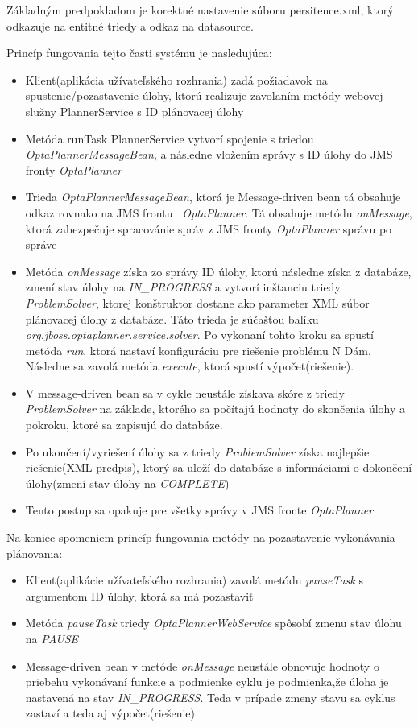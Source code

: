 Základným predpokladom je korektné nastavenie súboru persitence.xml, ktorý odkazuje na entitné triedy a odkaz na datasource.

Princíp fungovania tejto časti systému je nasledujúca:
\begin{itemize}
\item Klient(aplikácia užívateľského rozhrania) zadá požiadavok na spustenie/pozastavenie úlohy, ktorú realizuje zavolaním metódy webovej služny PlannerService s ID plánovacej úlohy
\item Metóda runTask PlannerService vytvorí spojenie s triedou \emph{OptaPlannerMessageBean}, a následne vložením správy s ID úlohy do JMS fronty \emph{OptaPlanner}
\item Trieda \emph{OptaPlannerMessageBean}, ktorá je Message-driven bean tá obsahuje odkaz rovnako na JMS frontu  \emph{OptaPlanner}. Tá obsahuje metódu \emph{onMessage}, ktorá zabezpečuje spracovánie správ z JMS fronty \emph{OptaPlanner} správu po správe
\item Metóda \emph{onMessage} získa zo správy ID úlohy, ktorú následne získa z databáze, zmení stav úlohy na \emph{IN_PROGRESS} a vytvorí inštanciu triedy \emph{ProblemSolver}, ktorej konštruktor dostane ako parameter XML súbor plánovacej úlohy z databáze. Táto trieda je súčaštou balíku \emph{org.jboss.optaplanner.service.solver}. Po vykonaní tohto kroku sa spustí metóda \emph{run}, ktorá nastaví konfiguráciu pre riešenie problému N Dám. Následne sa zavolá metóda \emph{execute}, ktorá spustí výpočet(riešenie).
\item V message-driven bean sa v cykle neustále získava skóre z triedy \emph{ProblemSolver} na základe, ktorého sa počítajú hodnoty do skončenia úlohy a pokroku, ktoré sa zapisujú do databáze.
\item Po ukončení/vyriešení úlohy sa z triedy \emph{ProblemSolver} získa najlepšie riešenie(XML predpis), ktorý sa uloží do databáze s informáciami o dokončení úlohy(zmení stav úlohy na \emph{COMPLETE})
\item Tento postup sa opakuje pre všetky správy v JMS fronte \emph{OptaPlanner}
\end{itemize}

Na koniec spomeniem princíp fungovania metódy na pozastavenie vykonávania plánovania:
\begin{itemize}
\item Klient(aplikácie užívateľského rozhrania) zavolá metódu \emph{pauseTask} s argumentom ID úlohy, ktorá sa má pozastaviť
\item Metóda \emph{pauseTask} triedy \emph{OptaPlannerWebService} spôsobí zmenu stav úlohu na \emph{PAUSE}
\item Message-driven bean v metóde \emph{onMessage} neustále obnovuje hodnoty o priebehu vykonávaní funkcie a podmienke cyklu je podmienka,že úloha je nastavená na stav \emph{IN_PROGRESS}. Teda v prípade zmeny stavu sa cyklus zastaví a teda aj výpočet(riešenie)
\end{itemize}
	
